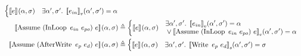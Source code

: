 \begin{align*}
\begin{cases}
  \denotef{e}{\targ,\tmem} & \exists \targ', \tmem' . \; \denotefv{e_{in}}{\targ',\tmem'} = \targ
\end{cases}\\
%
\denotef{\bop{Assume}{(\bop{InLoop}{e_{in}}{e_{po}})}{e}}{\targ,\tmem} &\eqdef
\begin{cases}
  \denotef{e}{\targ,\tmem} &
    \begin{aligned}
      &\exists \targ', \tmem' . \; \denotefv{e_{in}}{\targ',\tmem'} = \targ\\
      &\lor \denotefv{\bop{Assume}{(\bop{InLoop}{e_{in}}{e_{po}})}{e}}{\targ',\tmem'} = \targ
    \end{aligned}
\end{cases}\\
%
\denotef{\bop{Assume}{(\bop{AfterWrite}{e_p}{e_d})}{e}}{\targ,\tmem} &\eqdef
\begin{cases}
  \denotef{e}{\targ,\tmem} & \exists \targ', \tmem' . \; \denotefs{\bop{Write}{e_p}{e_d}}{\targ',\tmem'} = \tmem
\end{cases}\\
\end{align*}


\newpage

